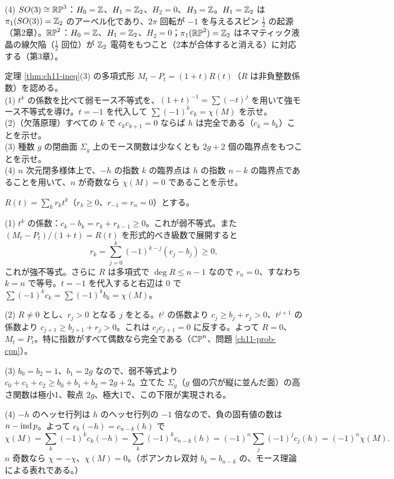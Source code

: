 \begin{solution}
(4) $SO(3)\cong\mathbb{RP}^3$：$H_0=\mathbb{Z}$、$H_1=\mathbb{Z}_2$、$H_2=0$、$H_3=\mathbb{Z}$。$H_1=\mathbb{Z}_2$ は $\pi_1(SO(3))=\mathbb{Z}_2$ のアーベル化であり、$2\pi$ 回転が $-1$ を与えるスピン $\tfrac12$ の起源（第2章）。$\mathbb{RP}^2$：$H_0=\mathbb{Z}$、$H_1=\mathbb{Z}_2$、$H_2=0$；$\pi_1(\mathbb{RP}^2)=\mathbb{Z}_2$ はネマティック液晶の線欠陥（$\tfrac12$ 回位）が $\mathbb{Z}_2$ 電荷をもつこと（2本が合体すると消える）に対応する（第3章）。
\end{solution}

\begin{problem}[難易度 B]\label{ch11-prob-ineq}
定理 \ref{thm:ch11-ineq}(3) の多項式形 $M_t-P_t=(1+t)R(t)$（$R$ は非負整数係数）を認める。\\
(1) $t^k$ の係数を比べて弱モース不等式を、$(1+t)^{-1}=\sum(-t)^j$ を用いて強モース不等式を導け。$t=-1$ を代入して $\sum(-1)^kc_k=\chi(M)$ を示せ。\\
(2)（欠落原理）すべての $k$ で $c_kc_{k+1}=0$ ならば $h$ は完全である（$c_k=b_k$）ことを示せ。\\
(3) 種数 $g$ の閉曲面 $\Sigma_g$ 上のモース関数は少なくとも $2g+2$ 個の臨界点をもつことを示せ。\\
(4) $n$ 次元閉多様体上で、$-h$ の指数 $k$ の臨界点は $h$ の指数 $n-k$ の臨界点であることを用いて、$n$ が奇数なら $\chi(M)=0$ であることを示せ。
\end{problem}

\begin{solution}
$R(t)=\sum_kr_kt^k$（$r_k\ge0$、$r_{-1}=r_n=0$）とする。

(1) $t^k$ の係数：$c_k-b_k=r_k+r_{k-1}\ge0$。これが弱不等式。また $(M_t-P_t)/(1+t)=R(t)$ を形式的べき級数で展開すると
\[
r_k=\sum_{j=0}^k(-1)^{k-j}(c_j-b_j)\ge0 ,
\]
これが強不等式。さらに $R$ は多項式で $\deg R\le n-1$ なので $r_n=0$、すなわち $k=n$ で等号。$t=-1$ を代入すると右辺は $0$ で $\sum(-1)^kc_k=\sum(-1)^kb_k=\chi(M)$。

(2) $R\neq0$ とし、$r_j>0$ となる $j$ をとる。$t^j$ の係数より $c_j\ge b_j+r_j>0$、$t^{j+1}$ の係数より $c_{j+1}\ge b_{j+1}+r_j>0$。これは $c_jc_{j+1}=0$ に反する。よって $R=0$、$M_t=P_t$。特に指数がすべて偶数なら完全である（$\mathbb{CP}^n$、問題 \ref{ch11-prob-cpn}）。

(3) $b_0=b_2=1$、$b_1=2g$ なので、弱不等式より $c_0+c_1+c_2\ge b_0+b_1+b_2=2g+2$。立てた $\Sigma_g$（$g$ 個の穴が縦に並んだ面）の高さ関数は極小1、鞍点 $2g$、極大1で、この下限が実現される。

(4) $-h$ のヘッセ行列は $h$ のヘッセ行列の $-1$ 倍なので、負の固有値の数は $n-\operatorname{ind} p$。よって $c_k(-h)=c_{n-k}(h)$ で
\[
\chi(M)=\sum_k(-1)^kc_k(-h)=\sum_k(-1)^kc_{n-k}(h)=(-1)^n\sum_j(-1)^jc_j(h)=(-1)^n\chi(M).
\]
$n$ 奇数なら $\chi=-\chi$、$\chi(M)=0$。（ポアンカレ双対 $b_k=b_{n-k}$ の、モース理論による表れである。）
\end{solution}

